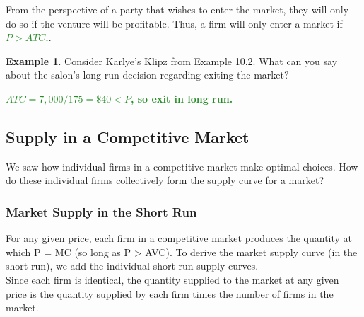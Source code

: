 \documentclass[11pt]{article}\usepackage[]{graphicx}\usepackage[]{color}
\theoremstyle{definition}
\newtheorem{exmp}{Example}[section]
\newcommand{\blank}[1]{}
\newcommand{\ddp}[1]{{\textbf{\textcolor{ForestGreen}{#1}}}}
\newcommand{\dd}[1]{{\underline{\textbf{\textcolor{ForestGreen}{#1}}}}}
\begin{document}
	From the perspective of a party that wishes to enter the market, they will only do so if the venture will be profitable. Thus, a firm will only enter a market if \dd{$P > ATC$.}.
	\\
	
	\begin{exmp}
		Consider Karlye's Klipz from Example 10.2. What can you say about the salon's long-run decision regarding exiting the market? 
	\end{exmp}
	\blank{}
	\ddp{$ATC = 7,000/175 = \$40 < P$, so exit in long run.}
	
	
	\subsection{Supply in a Competitive Market}
	
	We saw how individual firms in a competitive market make optimal choices. How do these individual firms collectively form the supply curve for a market? 
		
	\subsubsection*{Market Supply in the Short Run}
	
	For any given price, each firm in a competitive market produces the quantity at which P = MC (so long as P > AVC). To derive the market supply curve (in the short run), we add the individual short-run supply curves. 
	\\
	
	Since each firm is identical, the quantity supplied to the market at any given price is the quantity supplied by each firm times the number of firms in the market.
	
\end{document}
